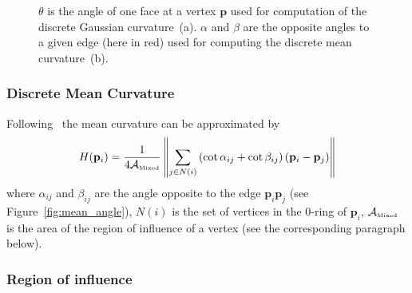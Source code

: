 \documentclass{InsightArticle}
\theoremstyle{plain}
\begin{document}
\begin{figure}[ht]
  \centering
  \hspace{0.5cm}
  \caption{$\theta$ is the angle of one face at a vertex $\mathbf{p}$ used for computation of the discrete Gaussian curvature~(a). $\alpha$ and $\beta$ are the opposite angles to a given edge (here in red) used for computing the discrete mean curvature~(b).}
\end{figure}


\subsubsection{Discrete Mean Curvature}

Following~\cite{Meyer02} the mean curvature can be approximated by
\begin{equation}
  H(\mathbf{p}_i) = \frac{1}{4 \mathcal{A}_{\text{\tiny{Mixed}}}} \left\| \sum_{j \in N(i)} \left( \cot \alpha_{ij} + \cot \beta_{ij} \right) ( \mathbf{p}_i - \mathbf{p}_j ) \right\| \label{eq:DiscreteMeanCurvature}
\end{equation}
where $\alpha_{ij}$ and $\beta_{ij}$ are the angle opposite to the edge $\mathbf{p}_i\mathbf{p}_j$ (see Figure~\ref{fig:mean_angle}), $N(i)$ is the set of vertices in the 0-ring of $\mathbf{p}_i$, $\mathcal{A}_{\text{\tiny{Mixed}}}$ is the area of the region of influence of a vertex (see the corresponding paragraph below).

\subsubsection{Region of influence}
\label{sec:RegionOfInfluence}
\end{document}
